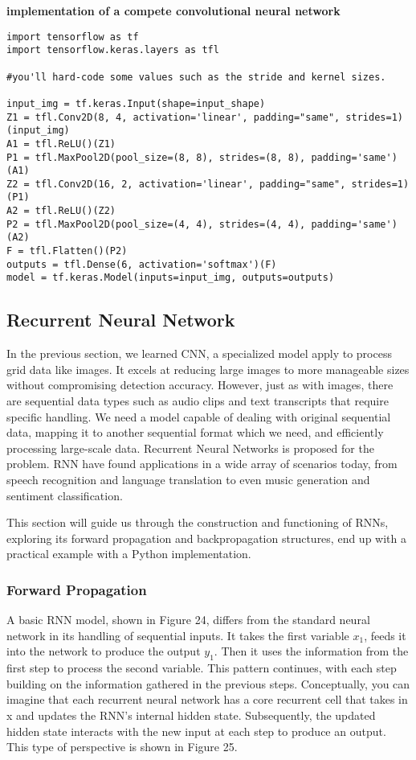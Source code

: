 \documentclass{article}
\begin{document}
\newpage
\noindent
\textbf{implementation of a compete convolutional neural network}
\begin{lstlisting}
import tensorflow as tf
import tensorflow.keras.layers as tfl

#you'll hard-code some values such as the stride and kernel sizes.

input_img = tf.keras.Input(shape=input_shape)
Z1 = tfl.Conv2D(8, 4, activation='linear', padding="same", strides=1)(input_img)
A1 = tfl.ReLU()(Z1)
P1 = tfl.MaxPool2D(pool_size=(8, 8), strides=(8, 8), padding='same')(A1)
Z2 = tfl.Conv2D(16, 2, activation='linear', padding="same", strides=1)(P1)
A2 = tfl.ReLU()(Z2)
P2 = tfl.MaxPool2D(pool_size=(4, 4), strides=(4, 4), padding='same')(A2)
F = tfl.Flatten()(P2)
outputs = tfl.Dense(6, activation='softmax')(F)
model = tf.keras.Model(inputs=input_img, outputs=outputs)

\end{lstlisting}


\newpage
\subsection{Recurrent Neural Network}

In the previous section, we learned CNN, a specialized model apply to process grid data like images. It excels at reducing large images to more manageable sizes without compromising detection accuracy. However, just as with images, there are sequential data types such as audio clips and text transcripts that require specific handling. We need a model capable of dealing with original sequential data, mapping it to another sequential format which we need, and efficiently processing large-scale data. Recurrent Neural Networks is proposed for the problem. RNN have found applications in a wide array of scenarios today, from speech recognition and language translation to even music generation and sentiment classification.

This section will guide us through the construction and functioning of RNNs, exploring its forward propagation and backpropagation structures, end up with a practical example with a Python implementation.

\newpage
\subsubsection{Forward Propagation}

A basic RNN model, shown in Figure 24, differs from the standard neural network in its handling of sequential inputs. It takes the first variable $x_1$, feeds it into the network to produce the output $y_1$. Then it uses the information from the first step to process the second variable. This pattern continues, with each step building on the information gathered in the previous steps. Conceptually, you can imagine that each recurrent neural network has a core recurrent cell that takes in x and updates the RNN's internal hidden state. Subsequently, the updated hidden state interacts with the new input at each step to produce an output. This type of perspective is shown in Figure 25.
\end{document}
